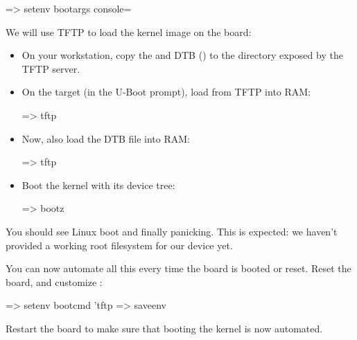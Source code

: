 \begin{ubootinput}
=> setenv bootargs console=%
\end{ubootinput}
We will use TFTP to load the kernel image on the board:

\begin{itemize}

\item On your workstation, copy the  and DTB
(\texttt\dtbname) to the directory exposed by the TFTP server.

\item On the target (in the U-Boot prompt), load  from
TFTP into RAM:
\begin{ubootinput}
=> tftp %
\end{ubootinput}

\item Now, also load the DTB file into RAM:
\begin{ubootinput}
=> tftp %
\end{ubootinput}

\item Boot the kernel with its device tree:
\begin{ubootinput}
=> bootz %
\end{ubootinput}

\end{itemize}

You should see Linux boot and finally panicking. This is expected: we
haven't provided a working root filesystem for our device yet.

You can now automate all this every time the board is booted or
reset. Reset the board, and customize :

\begin{ubootinput}
=> setenv bootcmd 'tftp %
=> saveenv
\end{ubootinput}

Restart the board to make sure that booting the kernel is now automated.

{

}
{}


{

}
{}



